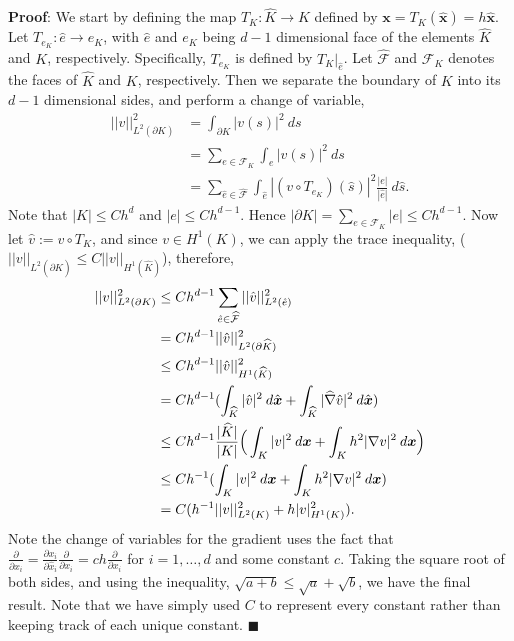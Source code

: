 \documentclass[11pt]{article}
\newcommand{\bs}{\boldsymbol}
\begin{document}
\vskip 1cm

{\bf Proof}: We start by defining the map $T_K : \widehat{K} \to K$ defined by $\bs{x} = T_K(\hat{\bs{x}}) = h \hat{\bs{x}}$.
Let $T_{e_K} : \hat{e} \to e_K$, with $\hat{e}$ and $e_K$ being $d-1$ dimensional face of the elements $\widehat{K}$ and $K$, respectively.
Specifically, $T_{e_K}$ is defined by $T_K|_{\hat{e}}$.
Let $\widehat{\mathcal{F}}$ and $\mathcal{F}_K$ denotes the faces of $\widehat{K}$ and $K$, respectively.
Then we separate the boundary of $K$ into its $d-1$ dimensional sides, and perform a change of variable, 
\begin{align*}
    ||v||^2_{L^2(\partial K)} &= \int_{\partial K} |v(s)|^2 \: ds \\
	&= \sum_{e \in \mathcal{F}_K} \int_e |v(s)|^2 \: ds \\
	&= \sum_{\hat{e}\in \widehat{\mathcal{F}}} \int_{\hat{e}} |(v\circ T_{e_K})(\hat{s})|^2 \frac{|e|}{|\hat{e}|} \: d\hat{s}.
\end{align*}
Note that $|K| \leq Ch^d$ and $|e| \leq Ch^{d-1}$.
Hence $|\partial K| = \sum_{e\in \mathcal{F}_K} |e| \leq Ch^{d-1}$.
Now let $\hat{v} := v \circ T_K$, and since $v \in H^1(K)$, we can apply the trace inequality, ($||v||_{L^2(\partial \widehat{K})} \leq C||v||_{H^1(\widehat{K})}$), therefore, 
\begin{align*}
	||v||_{L^2(\partial K)}^2 &\leq Ch^{d-1} \sum_{\hat{e}\in \widehat{\mathcal{F}}} ||\hat{v}||^2_{L^2(\hat{e})} \\ 
&= Ch^{d-1} ||\hat{v}||^2_{L^2(\partial \widehat{K})} \\
&\leq Ch^{d-1}||\Hat{v}||^2_{H^1(\widehat{K})} \\
	&= Ch^{d-1}(\int_{\widehat{K}} |\hat{v}|^2 \: d\hat{\bs{x}} + \int_{\widehat{K}} |\widehat{\nabla} \hat{v}|^2 \: d\hat{\bs{x}} ) \\
	&\leq Ch^{d-1} \frac{|\widehat{K}|}{|K|} \Big( \int_{K} |v|^2 \: d\bs{x} + \int_K h^2 |\nabla v|^2 \: d\bs{x} \Big) \\
	&\leq Ch^{-1}( \int_{K} |v|^2 \: d\bs{x} + \int_K h^2|\nabla v|^2 \: d\bs{x} ) \\
&= C(h^{-1} ||v||^2_{L^2(K)} + h|v|^2_{H^1(K)} ).
\end{align*}
Note the change of variables for the gradient uses the fact that $\frac{\partial}{\partial\hat{x}_i} = \frac{\partial x_i}{\partial \hat{x}_i} \frac{\partial}{\partial x_i} = ch \frac{\partial}{\partial x_i}$ for $i = 1, \ldots, d$ and some constant $c$.
Taking the square root of both sides, and using the inequality, $\sqrt{a+b} \leq \sqrt{a} + \sqrt{b}$, we have the final result. 
Note that we have simply used $C$ to represent every constant rather than keeping track of each unique constant.
$\blacksquare$
\end{document}
